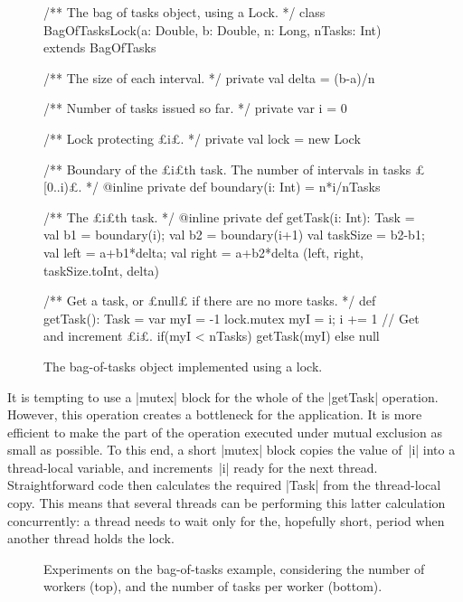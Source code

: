 \begin{figure}
\begin{scala}
/** The bag of tasks object, using a Lock. */
class BagOfTasksLock(a: Double, b: Double, n: Long, nTasks: Int)
    extends BagOfTasks{ 
  /** The size of each interval. */
  private val delta = (b-a)/n

  /** Number of tasks issued so far. */
  private var i = 0

  /** Lock protecting £i£. */
  private val lock = new Lock

  /** Boundary of the £i£th task.  The number of intervals in tasks £[0..i)£. */
  @inline private def boundary(i: Int) = n*i/nTasks

  /** The £i£th task. */
  @inline private def getTask(i: Int): Task = {
    val b1 = boundary(i); val b2 = boundary(i+1)
    val taskSize = b2-b1; val left = a+b1*delta; val right = a+b2*delta
    (left, right, taskSize.toInt, delta)
  }

  /** Get a task, or £null£ if there are no more tasks. */
  def getTask(): Task = {
    var myI = -1
    lock.mutex{ myI = i; i += 1} // Get and increment £i£.
    if(myI < nTasks) getTask(myI) else null
  }
}
\end{scala}
\caption{The bag-of-tasks object implemented using a lock.}
\label{fig:BagOfTasksLock}
\end{figure}


It is tempting to use a |mutex| block for the whole of the |getTask|
operation.  However, this operation creates a bottleneck for the application.
It is more efficient to make the part of the operation executed under mutual
exclusion as small as possible.  To this end, a short |mutex| block copies the
value of~|i| into a thread-local variable, and increments~|i| ready for the
next thread.  Straightforward code then calculates the required |Task| from
the thread-local copy.  This means that several threads can be performing this
latter calculation concurrently: a thread needs to wait only for the,
hopefully short, period when another thread holds the lock.



\begin{figure}
\begin{center}


\bigskip


\end{center}
\caption{Experiments on the bag-of-tasks example, considering the number of
  workers (top), and the number of tasks per worker (bottom).}
\label{fig:bag-of-tasks-experiment-monitors}
\end{figure}

